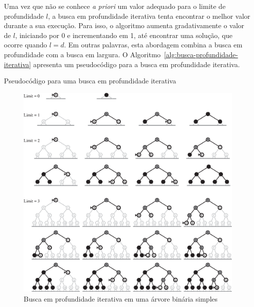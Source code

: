 Uma vez que não se conhece \textit{a priori} um valor adequado para o limite de profundidade $l$, a busca em profundidade iterativa tenta encontrar o melhor valor durante a sua execução. Para isso, o algoritmo aumenta gradativamente o valor de $l$, iniciando por 0 e incrementando em 1, até encontrar uma solução, que ocorre quando $l = d$. Em outras palavras, esta abordagem combina a busca em profundidade com a busca em largura. O Algoritmo~\ref{alg:busca-profundidade-iterativa} apresenta um pseudocódigo para a busca em profundidade iterativa.

\begin{algorithm}[h]
	\DontPrintSemicolon
	
	
	\caption{Pseudocódigo para uma busca em profundidade iterativa}
	\label{alg:busca-profundidade-iterativa}
\end{algorithm}

\begin{figure}[h]
	\centering
	\includegraphics[width=0.995\textwidth]{img/busca-profundidade-iterativa}
	\caption{Busca em profundidade iterativa em uma árvore binária simples}
	\label{fig:busca-profundidade-iterativa}
\end{figure}

